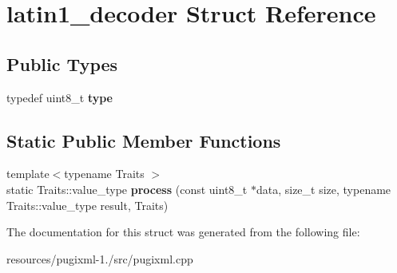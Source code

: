 \hypertarget{structlatin1__decoder}{\section{latin1\+\_\+decoder Struct Reference}
\label{structlatin1__decoder}
}
\subsection*{Public Types}
\begin{DoxyCompactItemize}
\item 
\hypertarget{structlatin1__decoder_a8eec1209fbcf34e5a8fe7bfc082f9c1b}{typedef uint8\+\_\+t {\bfseries type}}\label{structlatin1__decoder_a8eec1209fbcf34e5a8fe7bfc082f9c1b}

\end{DoxyCompactItemize}
\subsection*{Static Public Member Functions}
\begin{DoxyCompactItemize}
\item 
\hypertarget{structlatin1__decoder_acf3e6f85693d539919dec3bfb9cee66f}{{\footnotesize template$<$typename Traits $>$ }\\static Traits\+::value\+\_\+type {\bfseries process} (const uint8\+\_\+t $\ast$data, size\+\_\+t size, typename Traits\+::value\+\_\+type result, Traits)}\label{structlatin1__decoder_acf3e6f85693d539919dec3bfb9cee66f}

\end{DoxyCompactItemize}


The documentation for this struct was generated from the following file\+:\begin{DoxyCompactItemize}
\item 
resources/pugixml-\/1./src/pugixml.\+cpp\end{DoxyCompactItemize}
